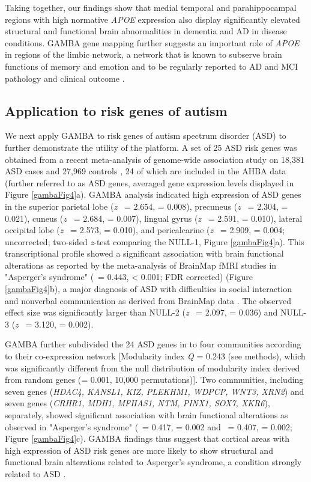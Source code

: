 \begin{refsection}
Taking together, our findings show that medial temporal and parahippocampal regions with high normative \textit{APOE} expression also display significantly elevated structural and functional brain abnormalities in dementia and AD in disease conditions. GAMBA gene mapping further suggests an important role of \textit{APOE} in regions of the limbic network, a network that is known to subserve brain functions of memory and emotion \citep{Catani2013ARL} and to be regularly reported to AD and MCI pathology and clinical outcome \citep{Nestor2003LimbicHI}.

\subsection*{Application to risk genes of autism}
We next apply GAMBA to risk genes of autism spectrum disorder (ASD) to further demonstrate the utility of the platform. A set of 25 ASD risk genes was obtained from a recent meta-analysis of genome-wide association study on 18,381 ASD cases and 27,969 controls \citep{Grove2019IdentificationOC}, 24 of which are included in the AHBA data (further referred to as ASD genes, averaged gene expression levels displayed in Figure \ref{gambaFig4}a). GAMBA analysis indicated high expression of ASD genes in the superior parietal lobe (\textit{z} \ = 2.654, \pval =  0.008), precuneus (\textit{z} \ = 2.304, \pval =  0.021), cuneus (\textit{z} \ = 2.684, \pval =  0.007), lingual gyrus (\textit{z} \ = 2.591, \pval =  0.010), lateral occipital lobe (\textit{z} \ = 2.573, \pval =  0.010), and pericalcarine (\textit{z} \ = 2.909, \pval =  0.004; uncorrected; two-sided \textit{z}-test comparing the NULL-1, Figure \ref{gambaFig4}a). This transcriptional profile showed a significant association with brain functional alterations as reported by the meta-analysis of BrainMap fMRI studies in "Asperger's syndrome" (\textbeta \ = 0.443, \pval < 0.001; FDR corrected) (Figure \ref{gambaFig4}b), a major diagnosis of ASD with difficulties in social interaction and nonverbal communication as derived from BrainMap data \citep{Fox2002MappingCA,Fox2005BrainMapTO,Laird2005BrainMapT}. The observed effect size was significantly larger than NULL-2 (\textit{z} \ = 2.097, \pval =  0.036) and NULL-3 (\textit{z} \ = 3.120, \pval =  0.002).

GAMBA further subdivided the 24 ASD genes in to four communities according to their co-expression network [Modularity index \textit{Q} = 0.243 (see methods), which was significantly different from the null distribution of modularity index derived from random genes (\pval = 0.001, 10,000 permutations)]. Two communities, including seven genes (\textit{HDAC4, KANSL1, KIZ, PLEKHM1, WDPCP, WNT3, XRN2}) and seven genes (\textit{CRHR1, MDH1, MFHAS1, NTM, PINX1, SOX7, XKR6}), separately, showed significant association with brain functional alterations as observed in "Asperger's syndrome" (\textbeta \ = 0.417, \pval =  0.002 and \textbeta \ = 0.407, \pval =  0.002; Figure \ref{gambaFig4}c). GAMBA findings thus suggest that cortical areas with high expression of ASD risk genes are more likely to show structural and functional brain alterations related to Asperger's syndrome, a condition strongly related to ASD \citep{Segal2010DiagnosticAS}.


\end{refsection}
